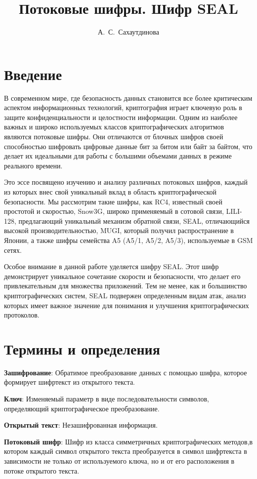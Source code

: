 \documentclass[colorthm]{../civarticle}
\title{
    Потоковые шифры. Шифр SEAL\\
}
\author{А.~С.~Сахаутдинова}
\begin{document}
\blindmathtrue
\section{Введение}
\label{sec:thm-pif}

В современном мире, где безопасность данных становится все более критическим аспектом информационных технологий, криптография играет ключевую роль в защите конфиденциальности и целостности информации. Одним из наиболее важных и широко используемых классов криптографических алгоритмов являются потоковые шифры. Они отличаются от блочных шифров своей способностью шифровать цифровые данные бит за битом или байт за байтом, что делает их идеальными для работы с большими объемами данных в режиме реального времени.

Это эссе посвящено изучению и анализу различных потоковых шифров, каждый из которых внес свой уникальный вклад в область криптографической безопасности. Мы рассмотрим такие шифры, как RC4, известный своей простотой и скоростью, Snow3G, широко применяемый в сотовой связи, LILI-128, предлагающий уникальный механизм обратной связи, SEAL, отличающийся высокой производительностью, MUGI, который получил распространение в Японии, а также шифры семейства A5 (A5/1, A5/2, A5/3), используемые в GSM сетях.

Особое внимание в данной работе уделяется шифру SEAL. Этот шифр демонстрирует уникальное сочетание скорости и безопасности, что делает его привлекательным для множества приложений. Тем не менее, как и большинство криптографических систем, SEAL подвержен определенным видам атак, анализ которых имеет важное значение для понимания и улучшения криптографических протоколов.

\section{Термины и определения}

\textbf{Зашифрование}: Обратимое преобразование данных с помощью шифра, которое формирует шифртекст из открытого текста.

\textbf{Ключ}: Изменяемый параметр в виде последовательности символов, определяющий криптографическое преобразование.

\textbf{Открытый текст}: Незашифрованная информация.

\textbf{Потоковый шифр}: Шифр из класса симметричных криптографических методов,в котором каждый символ открытого текста преобразуется в символ шифртекста в зависимости не только от используемого ключа, но и от его расположения в потоке открытого текста.
\end{document}

